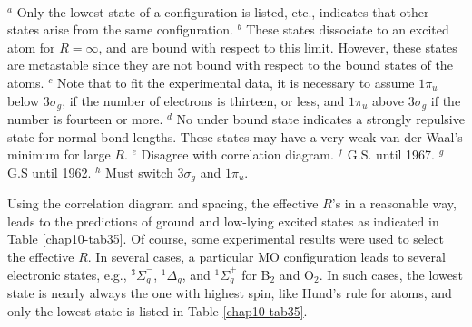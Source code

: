 \begin{table}
\\
$^a$ Only the lowest state of a configuration is listed, etc., 
indicates that other states arise from the same configuration.
$^b$ These states dissociate to an excited atom for $R = 
\infty$, and are bound with respect to this limit.  However, these states are 
metastable since they are not bound with respect to the bound 
states of the atoms.
$^c$ Note that to fit the experimental data, it is necessary to assume
$1 \pi_u$ below $3 \sigma_g$, if the number of electrons is thirteen, 
or less, and $1 \pi_u$ above $3 \sigma_g$ if the number is fourteen or more.
$^d$ No under bound state indicates a strongly repulsive state for
normal bond lengths. These states may have a very weak van der Waal's
minimum for large $R$.
$^e$ Disagree with correlation diagram.
$^f$ G.S. until 1967.
$^g$ G.S until 1962.
$^h$ Must switch $3 \sigma_g$ and $1 \pi_u$.
\end{table}

Using the correlation diagram and spacing, the effective $R$'s in a
reasonable way, leads to the predictions of ground and low-lying
excited states as indicated in Table \ref{chap10-tab35}.  Of course, some
experimental results were used to select the effective $R$. In several
cases, a particular MO configuration leads to several
electronic states, e.g., ${^3\Sigma}^-_g$, ${^1\Delta}_g$, and
${^1\Sigma}^+_g$ for B$_2$ and O$_2$.  In such cases, the lowest state
is nearly always the one with highest spin, like Hund's rule for
atoms, and only the lowest state is listed in
Table \ref{chap10-tab35}.
	
